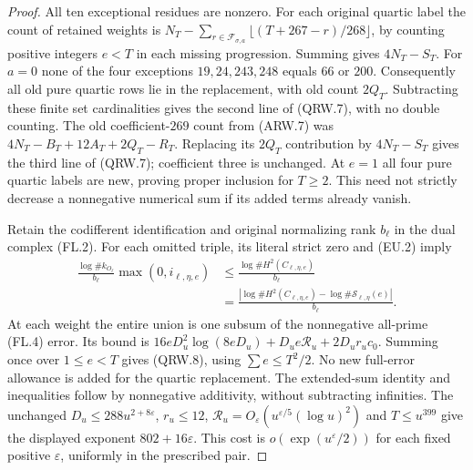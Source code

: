 \begin{proof}
All ten exceptional residues are nonzero.
For each original quartic label the count of retained weights is
$N_T-\sum_{r\in\mathcal F_{\sigma,a}}
\lfloor(T+267-r)/268\rfloor$, by counting positive integers
$e<T$ in each missing progression.  Summing gives $4N_T-S_T$.
For $a=0$ none of the four exceptions $19,24,243,248$
equals $66$ or $200$.
Consequently all old pure quartic rows lie in the replacement,
with old count $2Q_T$.
Subtracting these finite set cardinalities gives the second line
of (QRW.7), with no double counting.
The old coefficient-$269$ count from (ARW.7) was
$4N_T-B_T+12A_T+2Q_T-R_T$.
Replacing its $2Q_T$ contribution by $4N_T-S_T$ gives the
third line of (QRW.7); coefficient three is unchanged.
At $e=1$ all four pure quartic labels are new, proving proper
inclusion for $T\geq2$.  This need not strictly decrease a
nonnegative numerical sum if its added terms already vanish.

Retain the codifferent identification and original normalizing
rank $b_\ell$ in the dual complex (FL.2).
For each omitted triple, its literal strict zero and (EU.2) imply
\[
 \begin{aligned}
 \frac{\log\#k_{O_\ell}}{b_\ell}\max(0,i_{\ell,\eta,e})
 &\leq\frac{\log\#H^2(C_{\ell,\eta,e})}{b_\ell}\\
 &=\frac{\left|\log\#H^2(C_{\ell,\eta,e})
                  -\log\#\mathcal S_{\ell,\eta}(e)\right|}{b_\ell}.
 \end{aligned}
 \tag{QRW.10}
\]
At each weight the entire union is one subsum of the nonnegative
all-prime (FL.4) error.  Its bound is
$16eD_u^2\log(8eD_u)+D_ue\mathcal R_u+2D_ur_uc_0$.
Summing once over $1\leq e<T$ gives (QRW.8), using
$\sum e\leq T^2/2$.
No new full-error allowance is added for the quartic replacement.
The extended-sum identity and inequalities follow by nonnegative
additivity, without subtracting infinities.
The unchanged $D_u\leq288u^{2+8\varepsilon}$, $r_u\leq12$,
$\mathcal R_u=O_\varepsilon(u^{\varepsilon/5}(\log u)^2)$ and
$T\leq u^{399}$ give the displayed exponent $802+16\varepsilon$.
This cost is $o(\exp(u^\varepsilon/2))$ for each fixed positive
$\varepsilon$, uniformly in the prescribed pair.


\end{proof}
